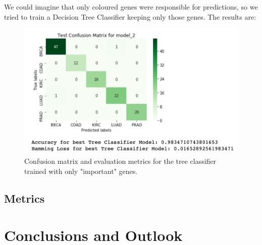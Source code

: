 \documentclass{article}
\begin{document}
We could imagine that only coloured genes were responsible for predictions, so we tried to train a Decision Tree Classifier keeping only those genes. The results are:

\begin{figure}[h!]
\centering
\includegraphics[width=\linewidth]{img/perm_matrix}
\caption{Confusion matrix and evaluation metrics for the tree classifier trained with only "important" genes.}
\label{fig_perm_m}
\end{figure}



\subsection{Metrics}





\section{Conclusions and Outlook}









\end{document}

